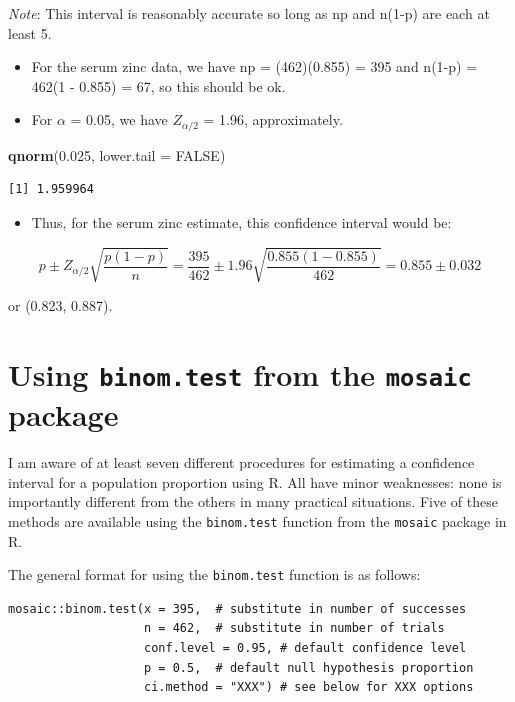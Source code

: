 \documentclass[
]{book}
\newenvironment{Shaded}{\begin{snugshade}}{\end{snugshade}}
\newcommand{\DataTypeTok}[1]{\textcolor[rgb]{0.13,0.29,0.53}{#1}}
\newcommand{\FloatTok}[1]{\textcolor[rgb]{0.00,0.00,0.81}{#1}}
\newcommand{\KeywordTok}[1]{\textcolor[rgb]{0.13,0.29,0.53}{\textbf{#1}}}
\newcommand{\NormalTok}[1]{#1}
\newcommand{\OtherTok}[1]{\textcolor[rgb]{0.56,0.35,0.01}{#1}}
\providecommand{\tightlist}{%
  \setlength{\itemsep}{0pt}\setlength{\parskip}{0pt}}
\begin{document}
\emph{Note}: This interval is reasonably accurate so long as np and n(1-p) are each at least 5.

\begin{itemize}
\item
  For the serum zinc data, we have np = (462)(0.855) = 395 and n(1-p) = 462(1 - 0.855) = 67, so this should be ok.
\item
  For \(\alpha\) = 0.05, we have \(Z_{\alpha/2}\) = 1.96, approximately.
\end{itemize}

\begin{Shaded}
\begin{Highlighting}[]
\KeywordTok{qnorm}\NormalTok{(}\FloatTok{0.025}\NormalTok{, }\DataTypeTok{lower.tail =} \OtherTok{FALSE}\NormalTok{)}
\end{Highlighting}
\end{Shaded}

\begin{verbatim}
[1] 1.959964
\end{verbatim}

\begin{itemize}
\tightlist
\item
  Thus, for the serum zinc estimate, this confidence interval would be:
\end{itemize}

\[
p \pm Z_{\alpha/2} \sqrt{\frac{p(1-p)}{n}} = 
\frac{395}{462} \pm 1.96 \sqrt{\frac{0.855(1-0.855)}{462}} = 0.855 \pm 0.032
\]

or (0.823, 0.887).

\hypertarget{using-binom.test-from-the-mosaic-package}{%
\section{\texorpdfstring{Using \texttt{binom.test} from the \texttt{mosaic} package}{Using binom.test from the mosaic package}}\label{using-binom.test-from-the-mosaic-package}}

I am aware of at least seven different procedures for estimating a confidence interval for a population proportion using R. All have minor weaknesses: none is importantly different from the others in many practical situations. Five of these methods are available using the \texttt{binom.test} function from the \texttt{mosaic} package in R.

The general format for using the \texttt{binom.test} function is as follows:

\begin{verbatim}
mosaic::binom.test(x = 395,  # substitute in number of successes
                   n = 462,  # substitute in number of trials
                   conf.level = 0.95, # default confidence level
                   p = 0.5,  # default null hypothesis proportion
                   ci.method = "XXX") # see below for XXX options
\end{verbatim}
\end{document}
